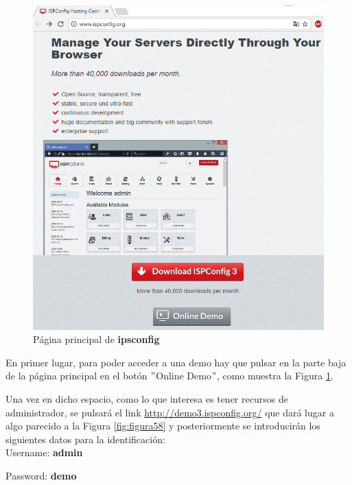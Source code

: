 \begin{figure}[H] %
	\centering
	\includegraphics[scale=0.5]{figuras/figura57.png} 
	\caption{Página principal de \textbf{ipsconfig}} 
	\label{fig:figura57}
\end{figure}

En primer lugar, para poder acceder a una demo hay que pulsar en la parte baja de la página principal en el botón $ " $Online Demo$ " $, como muestra la Figura \ref{fig:figura57}.

Una vez en dicho espacio, como lo que interesa es tener recursos de administrador, se pulsará el link \url{http://demo3.ispconfig.org/} que dará lugar a algo parecido a la Figura \ref{fig:figura58} y posteriormente se introducirán los siguientes datos para la identificación:
\\

Username: \textbf{admin}

Password: \textbf{demo}

